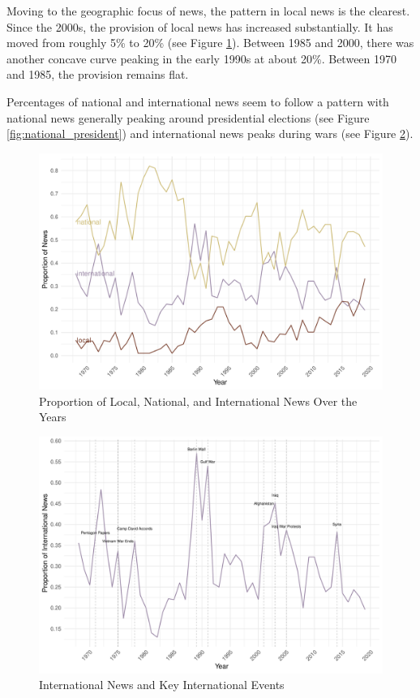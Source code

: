 \documentclass[12pt, letterpaper]{article}
\begin{document}


Moving to the geographic focus of news, the pattern in local news is the clearest. Since the 2000s, the provision of local news has increased substantially. It has moved from roughly 5\% to 20\% (see Figure \ref{fig:sub1_over_time}). Between 1985 and 2000, there was another concave curve peaking in the early 1990s at about 20\%. Between 1970 and 1985, the provision remains flat.

Percentages of national and international news seem to follow a pattern with national news generally peaking around presidential elections (see Figure \ref{fig:national_president}) and international news peaks during wars (see Figure \ref{fig:international_war}).

\begin{figure}[H]
  \centering
  \caption{Proportion of Local, National, and International News Over the Years}
  \label{fig:sub1_over_time}
  \includegraphics[width=.95\linewidth]{../figs/fig_geography.pdf}
\end{figure}

\begin{figure}[H]
  \centering
  \caption{International News and Key International Events}
  \label{fig:international_war}
  \includegraphics[width=.95\linewidth]{../figs/fig_geography_wars.pdf}
\end{figure}
\end{document}
